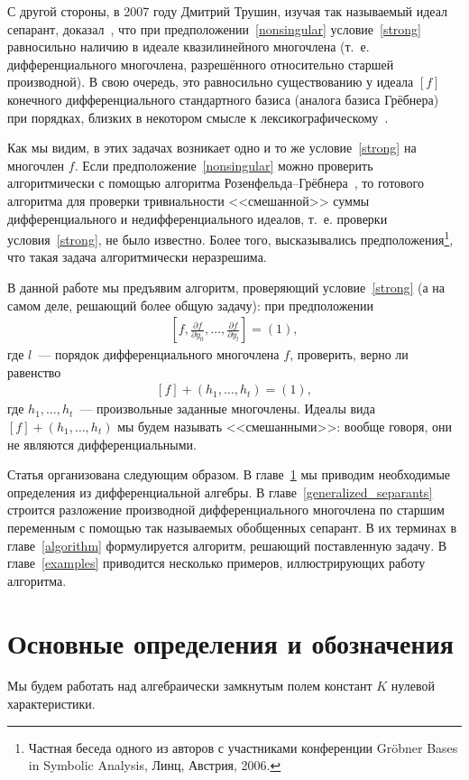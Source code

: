 \documentclass[11pt]{article}
\theoremstyle{plain1}
\theoremstyle{plain2}
\theoremstyle{plain}
\theoremstyle{plain3}
\theoremstyle{definition}
\theoremstyle{remark}
\begin{document}
С другой стороны, в 2007 году Дмитрий Трушин, изучая так называемый идеал сепарант, доказал~\cite{Trushin},
что при предположении~\eqref{nonsingular} условие~\eqref{strong} равносильно наличию в идеале квазилинейного многочлена
(т.~е. дифференциального многочлена, разрешённого относительно старшей производной).
В свою очередь, это равносильно существованию у идеала $[f]$ конечного дифференциального стандартного базиса (аналога базиса Грёбнера)
при порядках, близких в некотором смысле к лексикографическому~\cite{Zobnin}.

Как мы видим, в этих задачах возникает одно и то же условие~\eqref{strong} на многочлен $f$.
Если предположение~\eqref{nonsingular} можно проверить алгоритмически с помощью алгоритма Розенфельда--Грёбнера~\cite{BLOP, Sit},
то готового алгоритма для проверки тривиальности <<смешанной>> суммы дифференциального и недифференциального идеалов, т.~е. проверки условия~\eqref{strong}, не было известно.
Более того, высказывались предположения\footnote{Частная беседа одного из авторов с участниками конференции Gr\"obner Bases in Symbolic Analysis, Линц, Австрия, 2006.}, что такая задача алгоритмически неразрешима.

В данной работе мы предъявим алгоритм, проверяющий условие~\eqref{strong} (а на самом деле, решающий более общую задачу):
при предположении
\begin{gather}
\left[f, \frac{\partial f}{\partial y_0}, \ldots, \frac{\partial f}{\partial y_l} \right] = (1),
\end{gather}
где $l$~--- порядок дифференциального многочлена $f$,
проверить, верно ли равенство
\begin{gather}
\label{strong_general}
[f] + (h_1, \ldots, h_t) = (1),
\end{gather}
где $h_1, \ldots, h_t$~--- произвольные заданные многочлены.
Идеалы вида $[f] + (h_1, \ldots, h_t)$ мы будем называть <<смешанными>>: вообще говоря, они не являются дифференциальными.

Статья организована следующим образом. В главе~\ref{preliminaries} мы приводим необходимые определения из дифференциальной алгебры.
В главе~\ref{generalized_separants} строится разложение производной дифференциального многочлена по старшим переменным
с помощью так называемых обобщенных сепарант. В их терминах в главе~\ref{algorithm} формулируется алгоритм,
решающий поставленную задачу. В главе~\ref{examples} приводится несколько примеров, иллюстрирующих работу алгоритма.



\section{Основные определения и обозначения}
\label{preliminaries}
Мы будем работать над алгебраически замкнутым полем констант ${K}$ нулевой характеристики.
\end{document}
